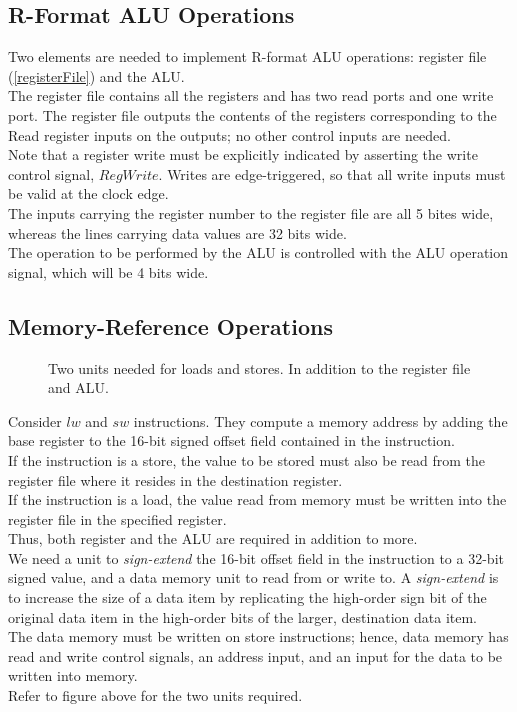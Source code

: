 \documentclass[12pt]{article}
\theoremstyle{definition}
\newcommand{\includePicture}[3]{
  \begin{figure}[!ht]
  \centering
  \scalebox{#1}{\texttt{[image: \#2]}}
  \caption{#3}
  \end{figure}
}
\begin{document}
  \subsection{R-Format ALU Operations}
  Two elements are needed to implement R-format ALU operations: register file (\ref{registerFile}) and the ALU. \\

  The register file contains all the registers and has two read ports and one write port.
  The register file outputs the contents of the registers corresponding to the Read register inputs on the outputs; no other control inputs are needed. \\
  Note that a register write must be explicitly indicated by asserting the write control signal, $RegWrite$.
  Writes are edge-triggered, so that all write inputs must be valid at the clock edge. \\

  The inputs carrying the register number to the register file are all 5 bites wide, whereas the lines carrying data values are 32 bits wide. \\
  The operation to be performed by the ALU is controlled with the ALU operation signal, which will be 4 bits wide.

  \subsection{Memory-Reference Operations}
  \includePicture{0.75}{pictures/elementsFormemoryReference.png}{Two units needed for loads and stores. In addition to the register file and ALU.}
  Consider $lw$ and $sw$ instructions.
  They compute a memory address by adding the base register to the 16-bit signed offset field contained in the instruction. \\
  If the instruction is a store, the value to be stored must also be read from the register file where it resides in the destination register. \\
  If the instruction is a load, the value read from memory must be written into the register file in the specified register. \\
  Thus, both register and the ALU are required in addition to more. \\

  We need a unit to \emph{sign-extend} the 16-bit offset field in the instruction to a 32-bit signed value, and a data memory unit to read from or write to.
  A \emph{sign-extend} is to increase the size of a data item by replicating the high-order sign bit of the original data item in the high-order bits of the larger, destination data item. \\
  The data memory must be written on store instructions; hence, data memory has read and write control signals, an address input, and an input for the data to be written into memory. \\
  Refer to figure above for the two units required.
\end{document}
